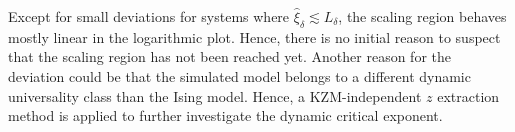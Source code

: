 	Except for small deviations for systems where $\hat{\xi}_\delta \lesssim L_\delta$, the scaling region behaves mostly linear in the logarithmic plot. Hence, there is no initial reason to suspect that the scaling region has not been reached yet. Another reason for the deviation could be that the simulated model belongs to a different dynamic universality class than the Ising model. Hence, a KZM-independent $z$ extraction method is applied to further investigate the dynamic critical exponent.	
	\begin{figure}
		\begin{subfigure}{0.475\textwidth}
			\centering
			
		\end{subfigure}
		\begin{subfigure}{0.475\textwidth}
			\centering
			
		\end{subfigure} \\ \par\bigskip
		\begin{subfigure}{0.475\textwidth}
			\centering
			
		\end{subfigure}
		\begin{subfigure}{0.475\textwidth}
			\centering
			
		\end{subfigure}

\end{figure}
